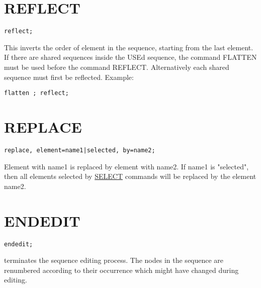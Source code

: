 \section{REFLECT}
\begin{verbatim}
reflect;
\end{verbatim} 
This inverts the order of element in the sequence, starting from the
last element. \\ 
If there are shared sequences inside the USEd sequence, the command
FLATTEN must be used before the command REFLECT.  Alternatively each
shared sequence must first be reflected. Example:   
\begin{verbatim}
flatten ; reflect; 
\end{verbatim}


\section{REPLACE}
\begin{verbatim}
replace, element=name1|selected, by=name2;
\end{verbatim} 
Element with name1 is replaced by element with name2. 
If name1 is "selected", then all elements selected by
\href{../Introduction/select.html}{SELECT} commands will be replaced by
the element name2.  


\section{ENDEDIT}
\begin{verbatim}
endedit;
\end{verbatim} 
terminates the sequence editing process. The nodes in the sequence are
renumbered according to their occurrence which might have changed during
editing.  



